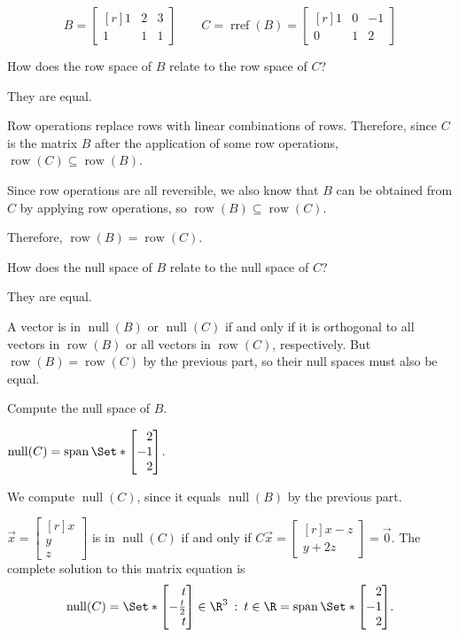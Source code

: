 \documentclass{problemset}
\DeclareMathOperator{\Span}{span}
\DeclareMathOperator{\Rref}{rref}
\DeclareMathOperator{\Null}{null}
\DeclareMathOperator{\Row}{row}
\newcommand{\rref}{\Rref}
\newcommand{\mat}[1]{\begin{bmatrix*}[r]#1\end{bmatrix*}}
\providecommand\given{}
\newcommand\SetSymbol[1][]{%
	\nonscript\::%
	\allowbreak
	\nonscript\:
	\mathopen{}}
\renewcommand\given{\SetSymbol[\delimsize]}
\begin{document}
	\question
	\[
		B=\mat{1&2&3\\1&1&1}\qquad C=\rref(B)=\mat{1&0&-1\\0&1&2}
	\]
	\begin{parts}
		\item How does the row space of $B$ relate to the row space of $C$?
			\begin{solution}
				They are equal.

				Row operations replace rows with linear combinations of rows.
				Therefore, since $C$ is the matrix $B$ after the application of
				some row operations, $\Row(C)\subseteq\Row(B)$.

				Since row operations are all reversible, we also know that $B$ 
				can be obtained from $C$ by applying row operations, so 
				$\Row(B)\subseteq\Row(C)$.

				Therefore, $\Row(B)=\Row(C)$.
			\end{solution}
		\item How does the null space of $B$ relate to the null space of $C$?
			\begin{solution}
				They are equal. 

				A vector is in $\Null(B)$ or $\Null(C)$ if and only if it is 
				orthogonal to all vectors in $\Row(B)$ or all vectors in $\Row(C)$,
				respectively. But $\Row(B)=\Row(C)$ by the previous part, so
				their null spaces must also be equal. 
			\end{solution}
		\item Compute the null space of $B$.
			\begin{solution}
				$\Null(C)=\Span\Set*{\mat{2\\-1\\2}}$.

				We compute $\Null(C)$, since it equals $\Null(B)$ by the previous part. 

				$\vec x=\mat{x\\y\\z}$ is in $\Null(C)$ if and only if
				$C\vec x = \mat{x-z\\y+2z} = \vec 0$. The complete solution to this matrix equation is
				\[
					\Null(C)=
					\Set*{\mat{t\\-\frac{t}{2}\\t}\in\R^3 \given t\in\R}
					=\Span\Set*{\mat{2\\-1\\2}}.
				\]
			\end{solution}
	\end{parts}
\end{document}
